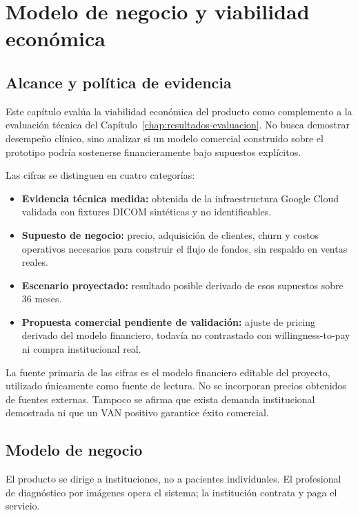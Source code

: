 \chapter{Modelo de negocio y viabilidad económica}
\label{chap:modelo-negocio-viabilidad}

\section{Alcance y política de evidencia}

Este capítulo evalúa la viabilidad económica del producto como complemento a la evaluación técnica del Capítulo~\ref{chap:resultados-evaluacion}. No busca demostrar desempeño clínico, sino analizar si un modelo comercial construido sobre el prototipo podría sostenerse financieramente bajo supuestos explícitos.

Las cifras se distinguen en cuatro categorías:
\begin{itemize}
  \item \textbf{Evidencia técnica medida:} obtenida de la infraestructura Google Cloud validada con fixtures DICOM sintéticas y no identificables.
  \item \textbf{Supuesto de negocio:} precio, adquisición de clientes, churn y costos operativos necesarios para construir el flujo de fondos, sin respaldo en ventas reales.
  \item \textbf{Escenario proyectado:} resultado posible derivado de esos supuestos sobre 36 meses.
  \item \textbf{Propuesta comercial pendiente de validación:} ajuste de pricing derivado del modelo financiero, todavía no contrastado con willingness-to-pay ni compra institucional real.
\end{itemize}

La fuente primaria de las cifras es el modelo financiero editable del proyecto, utilizado únicamente como fuente de lectura. No se incorporan precios obtenidos de fuentes externas. Tampoco se afirma que exista demanda institucional demostrada ni que un VAN positivo garantice éxito comercial.

\section{Modelo de negocio}

El producto se dirige a instituciones, no a pacientes individuales. El profesional de diagnóstico por imágenes opera el sistema; la institución contrata y paga el servicio.

